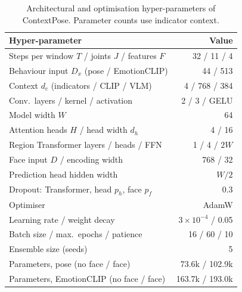 \begin{table}[t]
\centering
\caption{Architectural and optimisation hyper-parameters of ContextPose. Parameter counts use indicator context.}
\label{tab:hparams}
\footnotesize
\setlength{\tabcolsep}{4pt}
\begin{tabular}{@{}lr@{}}
\toprule
Hyper-parameter & Value \\
\midrule
Steps per window $T$ / joints $J$ / features $F$ & 32 / 11 / 4 \\
Behaviour input $D_x$ (pose / EmotionCLIP) & 44 / 513 \\
Context $d_c$ (indicators / CLIP / VLM) & 4 / 768 / 384 \\
Conv.\ layers / kernel / activation & 2 / 3 / GELU \\
Model width $W$ & 64 \\
Attention heads $H$ / head width $d_h$ & 4 / 16 \\
Region Transformer layers / heads / FFN & 1 / 4 / $2W$ \\
Face input $D$ / encoding width & 768 / 32 \\
Prediction head hidden width & $W/2$ \\
Dropout: Transformer, head $p_h$, face $p_f$ & 0.3 \\
\midrule
Optimiser & AdamW \\
Learning rate / weight decay & $3{\times}10^{-4}$ / 0.05 \\
Batch size / max.\ epochs / patience & 16 / 60 / 10 \\
Ensemble size (seeds) & 5 \\
\midrule
Parameters, pose (no face / face) & 73.6k / 102.9k \\
Parameters, EmotionCLIP (no face / face) & 163.7k / 193.0k \\
\bottomrule
\end{tabular}
\end{table}